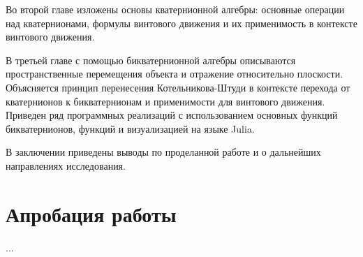 Во второй главе изложены основы кватернионной алгебры: основные операции над кватернионами, формулы винтового движения и их применимость в контексте винтового движения.

В третьей главе с помощью бикватернионной алгебры описываются пространственные перемещения объекта и отражение относительно плоскости. Объясняется принцип перенесения Котельникова-Штуди в контексте перехода от кватернионов к бикватернионам и применимости для винтового движения. Приведен ряд программных реализаций с использованием основных функций бикватернионов, функций и визуализацией на языке Julia.

В заключении приведены выводы по проделанной работе и о дальнейших направлениях исследования.

\section*{Апробация работы}

...


